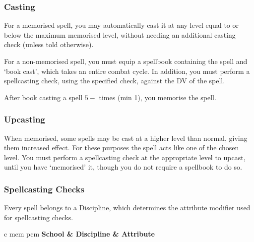 \begin{landscape}
\begin{multicols}{3}
\subsubsection{Casting}

For a memorised spell, you may automatically cast it at any level equal to or below the maximum memorised level, without needing an additional casting check (unless told otherwise).

For a non-memorised spell, you must equip a spellbook containing the spell and `book cast', which takes an entire combat cycle. In addition, you must perform a spellcasting check, using the specified check, against the DV of the spell. 

After book casting a spell $5 - $\attIntShort{} times (min 1), you memorise the spell. 

\subsubsection{Upcasting}

When memorised, some spells may be cast at a higher level than normal, giving them increased effect. For these purposes the spell acts like one of the chosen level. You must perform a spellcasting check at the appropriate level to upcast, until you have `memorised' it, though you do not require a spellbook to do so.



\subsubsection{Spellcasting Checks}
Every spell belongs to a Discipline, which determines the attribute modifier used for spellcasting checks.
\begin{center}
	\begin{rndtable}{c m{\xS cm} p{\wS cm}}
	\bf School	&	\bf Discipline	&	\bf Attribute
	\\
	\\
	\\
	\\
   \\ 
	\\
	\\
	\end{rndtable}
\end{center}


\end{multicols}
\end{landscape}

